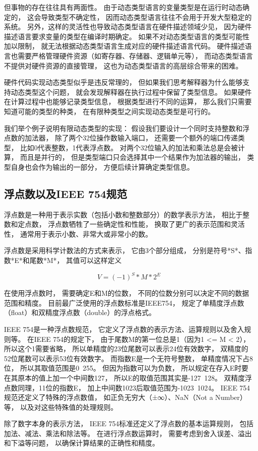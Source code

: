 但事物的存在往往具有两面性。
由于动态类型语言的变量类型是在运行时动态确定的，
这会导致类型不确定性，
因而动态类型语言往往不会用于开发大型稳定的系统。
另外，这样的灵活性也导致动态类型语言在硬件描述领域少见，
因为硬件描述语言要求变量的类型在编译时期确定。
如果不对动态类型语言的类型可能性加以限制，
就无法根据动态类型语言生成对应的硬件描述语言代码。
硬件描述语言也需要严格管理硬件资源（如寄存器、存储器、逻辑单元等），
而动态类型语言不提供对硬件资源的直接管理，
这也为动态类型语言的高层综合带来的困难。

硬件代码实现动态类型似乎是违反常理的，
但如果我们思考解释器为什么能够支持动态类型这个问题，
就会发现解释器在执行过程中保留了类型信息。
如果硬件在计算过程中也能够记录类型信息，
根据类型进行不同的运算，
那么我们只需要知道可能的类型的种类，
在有限种类型之间实现动态类型是可行的。

我们举个例子说明有限动态类型的实现：
假设我们要设计一个同时支持整数和浮点数的加法器，
除了两个32位操作数输入端口，
还需要一个额外的端口传递类型，
比如0代表整数，1代表浮点数。
对两个32位输入的加法和乘法总是会被计算，
而且是并行的，
但是类型端口只会选择其中一个结果作为加法器的输出，
类型自身也会作为输出的一部分，
方便后续计算确定类型信息。

\subsection{浮点数以及IEEE 754规范}

浮点数是一种用于表示实数（包括小数和整数部分）的数学表示方法，
相比于整数和定点数，
浮点数牺牲了一些确定性和性能，
换取了更广的表示范围和灵活性，
通常用于表示小数、非常大或非常小的数。

浮点数是采用科学计数法的方式来表示，
它由3个部分组成，
分别是符号*S*、指数*E*和尾数*M*，
其值可以这样定义

$$V =  (-1)^S * M * 2^E$$

在使用浮点数时，
需要确定E和M的位数，
不同的位数分别可以决定不同的数据范围和精度。
目前最广泛使用的浮点数标准是IEEE754，
规定了单精度浮点数（float）和双精度浮点数（double）的浮点格式。

IEEE 754是一种浮点数规范，
它定义了浮点数的表示方法、运算规则以及舍入规则等。
在IEEE 754的规定下，
由于尾数M的第一位总是1（因为1 <= M < 2），
所以这个1需要省略，
所以单精度的23位尾数可以表示24位有效数字，
双精度的52位尾数可以表示53位有效数字。
而指数E是一个无符号整数，
单精度情况下占8位，
所以其取值范围是0~255。
但因为指数可以为负数，
所以规定在存入E时要在其原本的值上加一个中间数127，
所以E的取值范围其实是-127~128。
双精度浮点数同理，11位的指数E，
加上中间数1023后取值范围为-1023~1024。
IEEE 754规范还定义了特殊的浮点数值，
如正负无穷大（±∞）、NaN（Not a Number）等，
以及对这些特殊值的处理规则。

除了数字本身的表示方法，
IEEE 754标准还定义了浮点数的基本运算规则，
包括加法、减法、乘法和除法等。
在进行浮点数运算时，
需要考虑到舍入误差、溢出和下溢等问题，
以确保计算结果的正确性和精度。